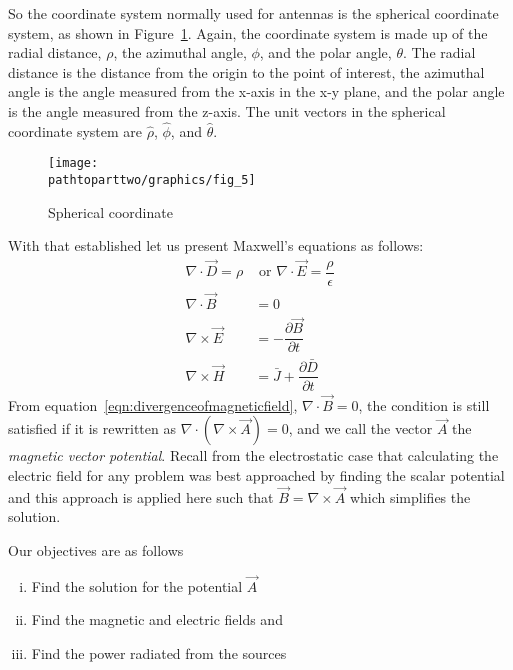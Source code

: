 So the coordinate system normally used for antennas is the spherical coordinate system, as shown in Figure~\ref{fig:sphericalcoordinate}. Again, the coordinate system is made up of the radial distance, $\rho$, the azimuthal angle, $\phi$, and the polar angle, $\theta$. The radial distance is the distance from the origin to the point of interest, the azimuthal angle is the angle measured from the x-axis in the x-y plane, and the polar angle is the angle measured from the z-axis. The unit vectors in the spherical coordinate system are $\hat{\rho}$, $\hat{\phi}$, and $\hat{\theta}$.
\begin{figure}[h]
\centering
\texttt{[image: \\pathtoparttwo/graphics/fig\_5]}
\caption{Spherical coordinate}
\label{fig:sphericalcoordinate}
\end{figure}

With that established let us present Maxwell's equations as follows:
\begin{align}
\nabla\cdot\vec{D} =\rho&\text{ or }\nabla \cdot\vec{E} =\dfrac{\rho}{\epsilon}\label{eqn:gausslaw}\\
\nabla\cdot\vec{B}&=0\label{eqn:divergenceofmagneticfield}\\
\nabla\times\vec{E}&=- \dfrac{\partial\vec{B}}{\partial t}\label{eqn:faradayslaw}\\
\nabla\times\vec{H}&=\bar{J}+\dfrac{\partial\bar{D}}{\partial t}\label{eqn:ampereslaw}
\end{align}
From equation~\eqref{eqn:divergenceofmagneticfield}, $\nabla\cdot\vec{B}=0$, the condition is still satisfied if it is rewritten as $\nabla\cdot(\nabla\times\vec{A})=0$, and we call the vector $\vec{A}$ the \emph{magnetic vector potential}. Recall from the electrostatic case that calculating the electric field for any problem was best approached by finding the scalar potential and this approach is applied here such that $\vec{B}=\nabla\times\vec{A}$ which simplifies the solution.

Our objectives are as follows
\begin{enumerate}[(i)]
\item Find the solution for the potential $\vec{A}$
\item Find the magnetic and electric fields and
\item Find the power radiated from the sources
\end{enumerate}

